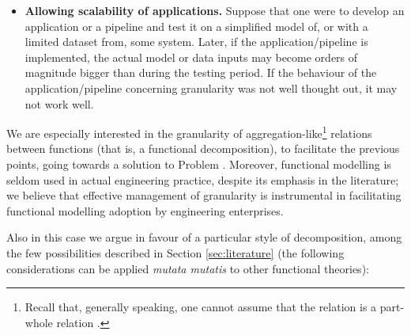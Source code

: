 \documentclass[
]{ceurart}
\begin{document}
\begin{itemize}
    \item \textbf{Allowing scalability of applications.} 
    Suppose that one were to develop an application or a pipeline and test it on a simplified model of, or with a limited dataset from, some system. Later, if the application/pipeline is implemented, the actual model or data inputs may become orders of magnitude bigger than during the testing period. If the behaviour of the application/pipeline concerning granularity was not well thought out, it may not work well.%
\end{itemize}

We are especially interested in the granularity of aggregation-like\footnote{Recall that, generally speaking, one cannot assume that the relation is a part-whole relation \cite{vermaasFormalImpossibilityAnalysing2013}.} relations between functions (that is, a functional decomposition), to facilitate the previous points, going towards a solution to Problem . Moreover, functional modelling is seldom used in actual engineering practice, despite its emphasis in the literature; we believe that effective management of granularity is instrumental in facilitating functional modelling adoption by engineering enterprises.

Also in this case we argue in favour of a particular style of decomposition, among the few possibilities described in Section \ref{sec:literature} (the following considerations can be applied \textit{mutata mutatis} to other functional theories):
\end{document}
